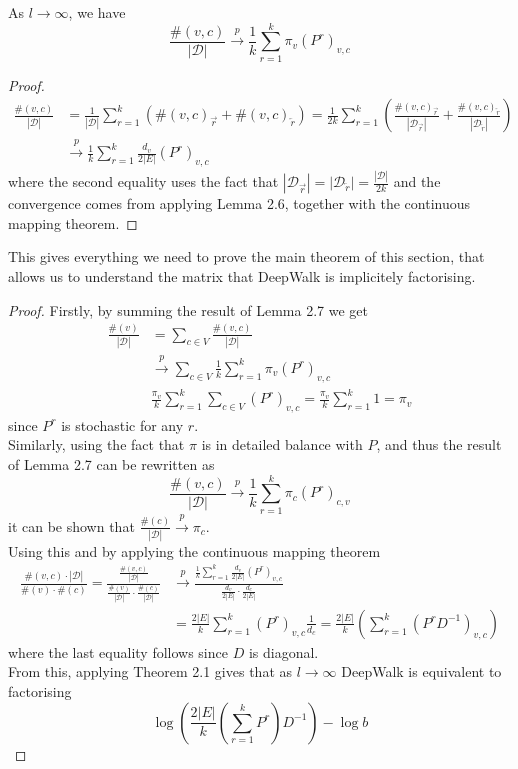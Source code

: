 \documentclass[a4paper]{article}
\newcommand{\D}{\mathcal D}
\newcommand{\rar}{\overrightarrow r}
\newcommand{\lar}{\overleftarrow r}
\begin{document}
\begin{lemma}
  As $l \to \infty$, we have
  \[\frac{\#(v, c)}{|\D|} \overset{p}{\longrightarrow} \frac{1}{k} \sum_{r = 1}^k \pi_v
    (P^r)_{v,c}\]
\end{lemma}
\begin{proof}
  \begin{align*}
    \frac{\#(v, c)}{|\D|} &=  \frac{1}{|\D|}\sum_{r=1}^k (\#(v, c)_{\rar} + \#(v, c)_{\lar})= \frac{1}{2k} \sum_{r=1}^k \left( \frac{\#(v, c)_{\rar}}{|\D_{\rar}|} + \frac{\#(v, c)_{\lar}}{|\D_{\lar}|} \right)\\
                          &\overset{p}{\longrightarrow} \frac{1}{k}\sum_{r=1}^{k} \frac{d_v}{2|E|}(P^r)_{v, c}
  \end{align*}
  where the second equality uses the fact that $|\D_{\rar}| = |\D_{\lar}| =
  \frac{|\D|}{2k}$ and the convergence comes from applying Lemma 2.6,
  together with the continuous mapping theorem.
\end{proof}
This gives everything we need to prove the main theorem of this section, that
allows us to understand the matrix that DeepWalk is implicitely factorising.
\MainDeepWalk*
\begin{proof}
  Firstly, by summing the result of Lemma 2.7 we get
  \begin{align*}
    \frac{\#(v)}{|\D|} &= \sum_{c \in V}\frac{\#(v, c)}{|\D|}\\
                       &\overset{p}{\longrightarrow} \sum_{c \in V} \frac{1}{k}\sum_{r=1}^k \pi_v(P^r)_{v, c}\\
                       &\frac{\pi_v}{k}\sum_{r = 1}^k \sum_{c \in V}(P^r)_{v,c} = \frac{\pi_v}{k}\sum_{r = 1}^k 1 = \pi_v
  \end{align*}
  since $P^r$ is stochastic for any $r$.\\
  Similarly, using the fact that $\pi$ is in detailed balance with $P$, and thus
  the result of Lemma 2.7 can be rewritten as
  \[\frac{\#(v, c)}{|\D|} \overset{p}{\longrightarrow} \frac{1}{k} \sum_{r = 1}^k \pi_c
    (P^r)_{c,v}\]
  it can be shown that $\frac{\#(c)}{|\D|} \overset{p}{\longrightarrow} \pi_c$.\\
  Using this and by applying the continuous mapping theorem
  \begin{align*}
    \frac{\#(v, c) \cdot |\D|}{\#(v) \cdot \#(c)} = \frac{\frac{\#(v,c)}{|\D|}}{\frac{\#(v)}{|\D|} \cdot \frac{\#(c)}{|\D|}} & \overset{p}{\longrightarrow} \frac{\frac{1}{k}\sum_{r=1}^{k} \frac{d_v}{2|E|}(P^r)_{v, c}}{\frac{d_v}{2|E|} \cdot \frac{d_c}{2|E|}}\\
                                                                                                                             &=\frac{2|E|}{k}\sum_{r=1}^k (P^r)_{v,c} \frac{1}{d_c} = \frac{2|E|}{k}\left( \sum_{r=1}^k(P^rD^{-1})_{v,c} \right)
  \end{align*}
  where the last equality follows since $D$ is diagonal.\\
  From this, applying Theorem 2.1 gives that as $l \to \infty$ DeepWalk is equivalent to
  factorising
  \[\log \left( \frac{2|E|}{k}\left( \sum_{r=1}^k P^r \right)D^{-1}\right) - \log{b}\]
\end{proof}
\end{document}
